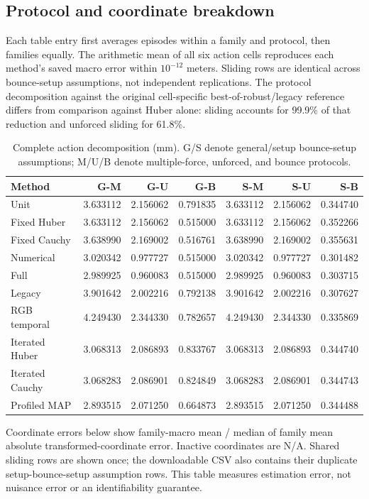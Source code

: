 \subsection{Protocol and coordinate breakdown}
Each table entry first averages episodes within a family and protocol, then families equally. The arithmetic mean of all six action cells reproduces each method's saved macro error within $10^{-12}$ meters. Sliding rows are identical across bounce-setup assumptions, not independent replications. The protocol decomposition against the original cell-specific best-of-robust/legacy reference differs from comparison against Huber alone: sliding accounts for 99.9\% of that reduction and unforced sliding for 61.8\%.
\begin{table}[htbp]\centering\small
\caption{Complete action decomposition (mm). G/S denote general/setup bounce-setup assumptions; M/U/B denote multiple-force, unforced, and bounce protocols.}\label{tab:ext_protocol}
\begin{tabular}{lrrrrrr}\toprule
Method & G-M & G-U & G-B & S-M & S-U & S-B\\\midrule
Unit & 3.633112 & 2.156062 & 0.791835 & 3.633112 & 2.156062 & 0.344740\\
Fixed Huber & 3.633112 & 2.156062 & 0.515000 & 3.633112 & 2.156062 & 0.352266\\
Fixed Cauchy & 3.638990 & 2.169002 & 0.516761 & 3.638990 & 2.169002 & 0.355631\\
Numerical & 3.020342 & 0.977727 & 0.515000 & 3.020342 & 0.977727 & 0.301482\\
Full & 2.989925 & 0.960083 & 0.515000 & 2.989925 & 0.960083 & 0.303715\\
Legacy & 3.901642 & 2.002216 & 0.792138 & 3.901642 & 2.002216 & 0.307627\\
RGB temporal & 4.249430 & 2.344330 & 0.782657 & 4.249430 & 2.344330 & 0.335869\\
Iterated Huber & 3.068313 & 2.086893 & 0.833767 & 3.068313 & 2.086893 & 0.344740\\
Iterated Cauchy & 3.068283 & 2.086901 & 0.824849 & 3.068283 & 2.086901 & 0.344743\\
Profiled MAP & 2.893515 & 2.071250 & 0.664873 & 2.893515 & 2.071250 & 0.344488\\
\bottomrule\end{tabular}
\end{table}
Coordinate errors below show family-macro mean / median of family mean absolute transformed-coordinate error. Inactive coordinates are N/A. Shared sliding rows are shown once; the downloadable CSV also contains their duplicate setup-bounce-setup assumption rows. This table measures estimation error, not nuisance error or an identifiability guarantee.
